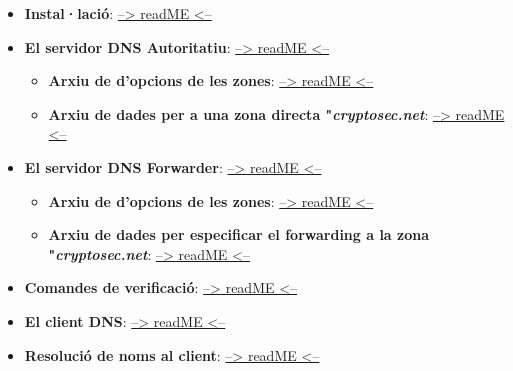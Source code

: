\documentclass[]{article}
\begin{document}
\begin{itemize}
  \begin{itemize}
  \item
    \textbf{Instal·lació}:
    \protect\hyperlink{installaciuxf3}{--\textgreater{} readME
    \textless{}--}
  \item
    \textbf{El servidor DNS Autoritatiu}:
    \protect\hyperlink{el-servidor-dns-autoritatiu}{--\textgreater{}
    readME \textless{}--}

    \begin{itemize}
    \item
      \textbf{Arxiu de d'opcions de les zones}:
      \protect\hyperlink{arxiu-de-dopcions-de-les-zones}{--\textgreater{}
      readME \textless{}--}
    \item
      \textbf{Arxiu de dades per a una zona directa
      "\emph{cryptosec.net}}:
      \protect\hyperlink{arxiu-de-dades-per-a-una-zona-directa-ux5cux2522cryptosecnetux5cux2522}{--\textgreater{}
      readME \textless{}--}
    \end{itemize}
  \item
    \textbf{El servidor DNS Forwarder}:
    \protect\hyperlink{el-servidor-dns-forwarder}{--\textgreater{}
    readME \textless{}--}

    \begin{itemize}
    \item
      \textbf{Arxiu de d'opcions de les zones}:
      \protect\hyperlink{arxiu-de-dopcions-de-les-zones-1}{--\textgreater{}
      readME \textless{}--}
    \item
      \textbf{Arxiu de dades per especificar el forwarding a la zona
      "\emph{cryptosec.net}}:
      \protect\hyperlink{arxiu-de-dades-per-especificar-el-forwarding-a-la-zona-ux5cux2522cryptosecnetux5cux2522}{--\textgreater{}
      readME \textless{}--}
    \end{itemize}
  \item
    \textbf{Comandes de verificació}:
    \protect\hyperlink{comandes-de-verificaciuxf3}{--\textgreater{}
    readME \textless{}--}
  \item
    \textbf{El client DNS}:
    \protect\hyperlink{el-client-dns}{--\textgreater{} readME
    \textless{}--}
  \item
    \textbf{Resolució de noms al client}:
    \protect\hyperlink{resoluciuxf3-de-noms-al-client}{--\textgreater{}
    readME \textless{}--}


\end{itemize}
\end{itemize}
\end{document}
